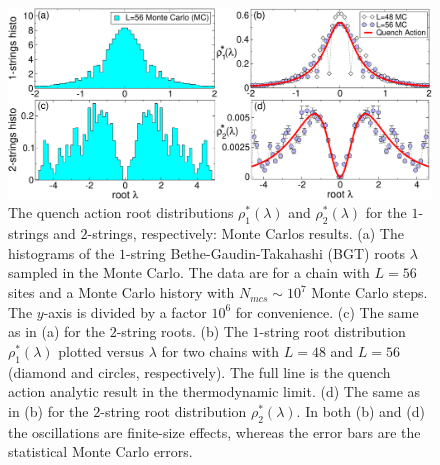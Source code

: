 \documentclass[11pt]{iopart}
\begin{document}
\begin{figure}[t]
\begin{center}
\includegraphics[width=.95\textwidth]{Neel_rho}
\end{center}
\caption{ The quench action root distributions $\rho^*_1(\lambda)$ and 
 $\rho^*_2(\lambda)$ for the $1$-strings and $2$-strings, respectively: Monte 
 Carlos results. (a) The histograms of the $1$-string Bethe-Gaudin-Takahashi 
 (BGT) roots $\lambda$ sampled in the Monte Carlo. The data are for a chain 
 with $L=56$ sites and a Monte Carlo history with $N_{mcs}\sim 10^7$ Monte 
 Carlo steps. The $y$-axis is divided by a factor $10^6$ for convenience. 
 (c) The same as in (a) for the $2$-string roots. (b) The $1$-string root distribution 
 $\rho^*_1(\lambda)$ plotted versus $\lambda$ for two chains with $L=48$ 
 and $L=56$ (diamond and circles, respectively). The full line 
 is the quench action analytic result in the thermodynamic limit. (d) 
 The same as in (b) for the $2$-string root distribution $\rho^*_2(\lambda)$. 
 In both (b) and (d) the oscillations are finite-size effects, whereas 
 the error bars are the statistical Monte Carlo errors. 
}
\label{fig4:Neel-rho}
\end{figure}
\end{document}
